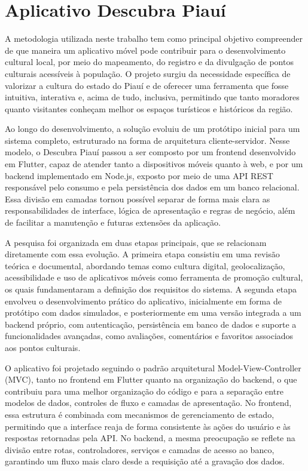 \chapter{Aplicativo Descubra Piauí} \label{cha:}

A metodologia utilizada neste trabalho tem como principal objetivo compreender de que maneira um aplicativo móvel pode contribuir para o desenvolvimento cultural local, por meio do mapeamento, do registro e da divulgação de pontos culturais acessíveis à população. O projeto surgiu da necessidade específica de valorizar a cultura do estado do Piauí e de oferecer uma ferramenta que fosse intuitiva, interativa e, acima de tudo, inclusiva, permitindo que tanto moradores quanto visitantes conheçam melhor os espaços turísticos e históricos da região.

Ao longo do desenvolvimento, a solução evoluiu de um protótipo inicial para um sistema completo, estruturado na forma de arquitetura cliente-servidor. Nesse modelo, o Descubra Piauí passou a ser composto por um frontend desenvolvido em Flutter, capaz de atender tanto a dispositivos móveis quanto à web, e por um backend implementado em Node.js, exposto por meio de uma API REST responsável pelo consumo e pela persistência dos dados em um banco relacional. Essa divisão em camadas tornou possível separar de forma mais clara as responsabilidades de interface, lógica de apresentação e regras de negócio, além de facilitar a manutenção e futuras extensões da aplicação.

A pesquisa foi organizada em duas etapas principais, que se relacionam diretamente com essa evolução. A primeira etapa consistiu em uma revisão teórica e documental, abordando temas como cultura digital, geolocalização, acessibilidade e uso de aplicativos móveis como ferramenta de promoção cultural, os quais fundamentaram a definição dos requisitos do sistema. A segunda etapa envolveu o desenvolvimento prático do aplicativo, inicialmente em forma de protótipo com dados simulados, e posteriormente em uma versão integrada a um backend próprio, com autenticação, persistência em banco de dados e suporte a funcionalidades avançadas, como avaliações, comentários e favoritos associados aos pontos culturais.

O aplicativo foi projetado seguindo o padrão arquitetural Model-View-Controller (MVC), tanto no frontend em Flutter quanto na organização do backend, o que contribuiu para uma melhor organização do código e para a separação entre modelos de dados, controles de fluxo e camadas de apresentação. No frontend, essa estrutura é combinada com mecanismos de gerenciamento de estado, permitindo que a interface reaja de forma consistente às ações do usuário e às respostas retornadas pela API. No backend, a mesma preocupação se reflete na divisão entre rotas, controladores, serviços e camadas de acesso ao banco, garantindo um fluxo mais claro desde a requisição até a gravação dos dados.

